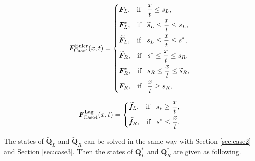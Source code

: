 \documentclass{article}
\numberwithin{equation}{section}
\numberwithin{table}{section}
\begin{document}
 \begin{equation}\label{eq:HLLCEP}
   \bm{F}^{\text{Euler}}_{\text{Case4}}(x,t) = \left\{ \begin{aligned}
		& \bm{F}_L, \hspace{0.3cm} \text{if} \hspace{0.3cm} \frac{x}{t}\le s_L, \\
		& \bm{F}_L^*, \hspace{0.3cm} \text{if} \hspace{0.3cm} \widetilde{s}_L\le \frac{x}{t} \le s_L, \\
		& \widetilde{\bm{F}}_L, \hspace{0.3cm} \text{if} \hspace{0.3cm} s_L\le \frac{x}{t} \le s^*, \\
		& \widetilde{\bm{F}}_R, \hspace{0.3cm} \text{if} \hspace{0.3cm} s^*\le \frac{x}{t} \le s_R, \\
		& \bm{F}_R^*, \hspace{0.3cm} \text{if} \hspace{0.3cm} s_R\le \frac{x}{t} \le\widetilde{ s}_R,\\
		& \bm{F}_R, \hspace{0.3cm} \text{if} \hspace{0.3cm} \frac{x}{t}\ge s_R, \\
	  \end{aligned}
	\right.
  \end{equation}

\begin{equation}
\bm{F}^{\text{Lag}}_{\text{Case4}}(x,t) = \left\{ \begin{aligned}
		& \widetilde{\bm{f}}_L, \hspace{0.3cm} \text{if} \hspace{0.3cm} s_*\ge \frac{x}{t},\\
		& \widetilde{\bm{f}}_R, \hspace{0.3cm} \text{if} \hspace{0.3cm} s^*\le \frac{x}{t}.\\
	  \end{aligned}
	\right.
  \end{equation}

The states of $\widetilde{\bm{Q}}_L$ and   $\widetilde{\bm{Q}}_R$ can be solved in the same way with Section \ref{sec:case2} and Section \ref{sec:case3}. Then the states of $\bm{Q}^*_L$ and $\bm{Q}^*_R$ are given as following.
\end{document}

